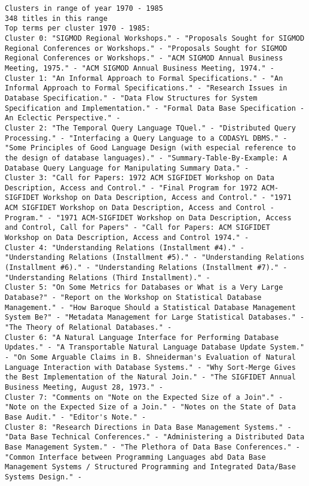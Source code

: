 \documentclass[11pt]{article}
\begin{document}
\begin{verbatim}
Clusters in range of year 1970 - 1985
348 titles in this range
Top terms per cluster 1970 - 1985:
Cluster 0: "SIGMOD Regional Workshops." - "Proposals Sought for SIGMOD Regional Conferences or Workshops." - "Proposals Sought for SIGMOD Regional Conferences or Workshops." - "ACM SIGMOD Annual Business Meeting, 1975." - "ACM SIGMOD Annual Business Meeting, 1974." - 
Cluster 1: "An Informal Approach to Formal Specifications." - "An Informal Approach to Formal Specifications." - "Research Issues in Database Specification." - "Data Flow Structures for System Specification and Implementation." - "Formal Data Base Specification - An Eclectic Perspective." - 
Cluster 2: "The Temporal Query Language TQuel." - "Distributed Query Processing." - "Interfacing a Query Language to a CODASYL DBMS." - "Some Principles of Good Language Design (with especial reference to the design of database languages)." - "Summary-Table-By-Example: A Database Query Language for Manipulating Summary Data." - 
Cluster 3: "Call for Papers: 1972 ACM SIGFIDET Workshop on Data Description, Access and Control." - "Final Program for 1972 ACM-SIGFIDET Workshop on Data Description, Access and Control." - "1971 ACM SIGFIDET Workshop on Data Description, Access and Control - Program." - "1971 ACM-SIGFIDET Workshop on Data Description, Access and Control, Call for Papers" - "Call for Papers: ACM SIGFIDET Workshop on Data Description, Access and Control 1974." - 
Cluster 4: "Understanding Relations (Installment #4)." - "Understanding Relations (Installment #5)." - "Understanding Relations (Installment #6)." - "Understanding Relations (Installment #7)." - "Understanding Relations (Third Installment)." - 
Cluster 5: "On Some Metrics for Databases or What is a Very Large Database?" - "Report on the Workshop on Statistical Database Management." - "How Baroque Should a Statistical Database Management System Be?" - "Metadata Management for Large Statistical Databases." - "The Theory of Relational Databases." - 
Cluster 6: "A Natural Language Interface for Performing Database Updates." - "A Transportable Natural Language Database Update System." - "On Some Arguable Claims in B. Shneiderman's Evaluation of Natural Language Interaction with Database Systems." - "Why Sort-Merge Gives the Best Implementation of the Natural Join." - "The SIGFIDET Annual Business Meeting, August 28, 1973." - 
Cluster 7: "Comments on "Note on the Expected Size of a Join"." - "Note on the Expected Size of a Join." - "Notes on the State of Data Base Audit." - "Editor's Note." - 
Cluster 8: "Research Directions in Data Base Management Systems." - "Data Base Technical Conferences." - "Administering a Distributed Data Base Management System." - "The Plethora of Data Base Conferences." - "Common Interface between Programming Languages abd Data Base Management Systems / Structured Programming and Integrated Data/Base Systems Design." - 

\end{verbatim}
\end{document}
